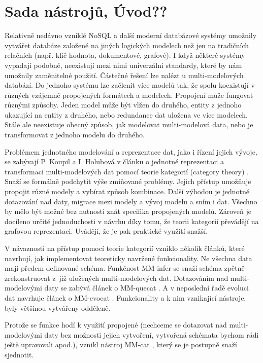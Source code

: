 \pagestyle{plain}  %

\chapter{Sada nástrojů, Úvod??}

Relativně nedávno vzniklé NoSQL a další moderní databázové systémy umožnily vytvářet databáze založené na jiných logických modelech než jen na tradičních relačních (např. klíč-hodnota, dokumentové, grafové). I když některé systémy vypadají podobně, neexistují mezi nimi univerzální standardy, které by nám umožnily zaměnitelné použití. Částečné řešení lze nalézt u multi-modelových databází. Do jednoho systému lze začlenit více modelů tak, že spolu koexistují v různých vzájemně propojených formátech a modelech. Propojení může fungovat různými způsoby. Jeden model může být vlžen do druhého, entity z jednoho ukazující na entity z druhého, nebo redundance dat uložena ve více modelech. Stále ale neexistuje obecný způsob, jak modelovat multi-modelová data, nebo je transformovat z jednoho modelu do druhého.

Problémem jednotného modelování a reprezentace dat, jako i řízení jejich vývoje, se zabývají P. Koupil a I. Holubová v článku o jednotné reprezentaci a transformaci multi-modelových dat pomocí teorie kategorií (category theory) \cite{cat_theory}. Snaží se formálně podchytit výše zmiňované problémy. Jejich přístup umožňuje propojit různé modely a vybírat způsob kombinace. Další výhodou je jednotné dotazování nad daty, migrace mezi modely a vývoj modelu a sním i dat. Všechno by mělo být možné bez nutnosti znát specifika propojených modelů. Zároveň je docíleno určité jednoduchosti v návrhu díky tomu, že teorii kategorií převádějí na grafovou reprezentaci. Uvádějí, že je pak praktické využití snažší.

V návaznosti na přístup pomocí teorie kategorií vzniklo několik článků, které navrhují, jak implementovat teoreticky navržené funkcionality. Ne všechna data mají předem definované schéma. Funkčnost MM-infer \cite{MM_infer} se snaží schéma zpětně zrekonstruovat z~již uložených multi-modelových dat. Dotazováním nad multi-modelovými daty se zabývá článek o MM-quecat \cite{MM_quecat}. A v neposlední řadě evoluci dat navrhuje článek o MM-evocat \cite{MM_evocat}. Funkcionality a k nim vznikající nástroje, byly většinou vytvářeny odděleně. 

Protože se funkce hodí k využití propojené (nechceme se dotazovat nad multi-modelovými daty bez možnosti jejich vytvoření, vytvořená schémata bychom rádi ještě upravovali apod.), vznikl nástroj MM-cat \cite{MM_cat}, který se je postupně snaží sjednotit.

